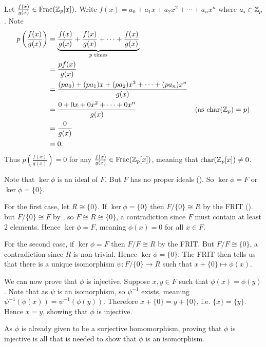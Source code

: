 \begin{questions}
\begin{partquestions}{\alph*}
        \item Let $\frac{f(x)}{g(x)} \in \mathrm{Frac}(\mathbb{Z}_p[x])$. Write $f(x) = a_0 + a_1x + a_2x^2 + \cdots + a_nx^n$ where $a_i \in \mathbb{Z}_p$. Note
        \begin{align*}
            p\left(\frac{f(x)}{g(x)}\right) &= \underbrace{\frac{f(x)}{g(x)} + \frac{f(x)}{g(x)} + \cdots + \frac{f(x)}{g(x)}}_{p \text{ times}}\\
            &= \frac{pf(x)}{g(x)}\\
            &= \frac{(pa_0) + (pa_1)x + (pa_2)x^2 + \cdots + (pa_n)x^n}{g(x)}\\
            &= \frac{0 + 0x + 0x^2 + \cdots + 0x^n}{g(x)} & (\text{as }\mathrm{char}(\mathbb{Z}_p) = p)\\
            &= \frac0{g(x)}\\
            &= 0.
        \end{align*}
        Thus $p\left(\frac{f(x)}{g(x)}\right) = 0$ for any $\frac{f(x)}{g(x)} \in \mathrm{Frac}(\mathbb{Z}_p[x])$, meaning that $\mathrm{char}(\mathbb{Z}_p[x]) \neq 0$.
    \end{partquestions}
    
    \item Note that $\ker\phi$ is an ideal of $F$. But $F$ has no proper ideals (). So $\ker\phi = F$ or $\ker\phi = \{0\}$.
    
    For the first case, let $R \cong \{0\}$. If $\ker\phi = \{0\}$ then $F/\{0\} \cong R$ by the FRIT (). but $F/\{0\} \cong F$ by , so $F \cong R \cong \{0\}$, a contradiction since $F$ must contain at least 2 elements. Hence $\ker\phi = F$, meaning $\phi(x) = 0$ for all $x \in F$.

    For the second case, if $\ker\phi = F$ then $F/F \cong R$ by the FRIT. But $F/F \cong \{0\}$, a contradiction since $R$ is non-trivial. Hence $\ker\phi = \{0\}$. The FRIT then tells us that there is a unique isomorphism $\psi: F/\{0\} \to R$ such that $x + \{0\} \mapsto \phi(x)$.
    
    We can now prove that $\phi$ is injective. Suppose $x, y \in F$ such that $\phi(x) = \phi(y)$. Note that as $\psi$ is an isomorphism, so $\psi^{-1}$ exists, meaning $\psi^{-1}\left(\phi(x)\right) = \psi^{-1}\left(\phi(y)\right)$. Therefore $x + \{0\} = y + \{0\}$, i.e. $\{x\} = \{y\}$. Hence $x = y$, showing that $\phi$ is injective.

    As $\phi$ is already given to be a surjective homomorphism, proving that $\phi$ is injective is all that is needed to show that $\phi$ is an isomorphism.
\end{questions}
